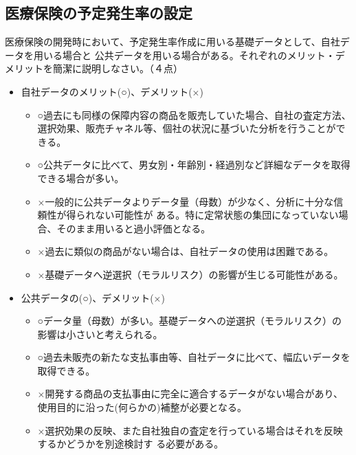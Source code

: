 \documentclass[report,gutter=10mm,fore-edge=10mm,uplatex,dvipdfmx]{jlreq}
\begin{document}
\subsection{医療保険の予定発生率の設定}
医療保険の開発時において、予定発生率作成に用いる基礎データとして、自社データを用いる場合と
公共データを用いる場合がある。それぞれのメリット・デメリットを簡潔に説明しなさい。（４点）
\begin{itemize}
 \item 自社データのメリット(○)、デメリット(×)
\begin{itemize}
 \item ○過去にも同様の保障内容の商品を販売していた場合、自社の査定方法、選択効果、販売チャネル等、個社の状況に基づいた分析を行うことができる。
 \item ○公共データに比べて、男女別・年齢別・経過別など詳細なデータを取得できる場合が多い。
 \item ×一般的に公共データよりデータ量（母数）が少なく、分析に十分な信頼性が得られない可能性が
ある。特に定常状態の集団になっていない場合、そのまま用いると過小評価となる。
 \item ×過去に類似の商品がない場合は、自社データの使用は困難である。
 \item ×基礎データへ逆選択（モラルリスク）の影響が生じる可能性がある。
\end{itemize}
 \item 公共データの(○)、デメリット(×)
\begin{itemize}
 \item ○データ量（母数）が多い。基礎データへの逆選択（モラルリスク）の影響は小さいと考えられる。
 \item ○過去未販売の新たな支払事由等、自社データに比べて、幅広いデータを取得できる。
 \item ×開発する商品の支払事由に完全に適合するデータがない場合があり、使用目的に沿った(何らかの)補整が必要となる。
 \item ×選択効果の反映、また自社独自の査定を行っている場合はそれを反映するかどうかを別途検討す
る必要がある。
\end{itemize}
\end{itemize}
\end{document}
